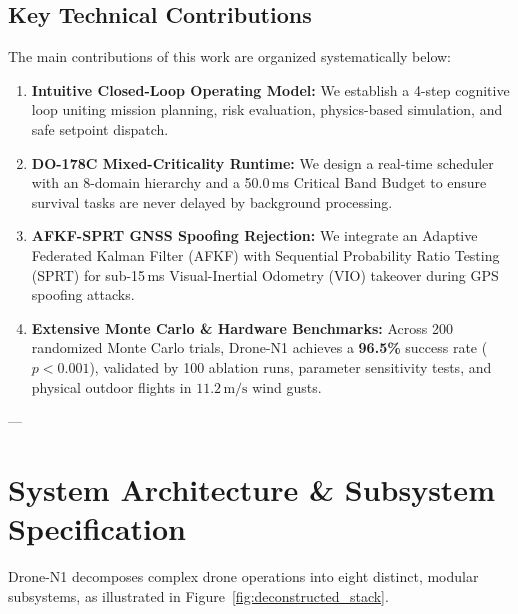 \documentclass[pdflatex,sn-mathphys-num]{sn-jnl}%
\theoremstyle{thmstyleone}%
\theoremstyle{thmstyletwo}%
\theoremstyle{thmstylethree}%
\begin{document}
\subsection{Key Technical Contributions}
The main contributions of this work are organized systematically below:
\begin{enumerate}
    \item \textbf{Intuitive Closed-Loop Operating Model:} We establish a 4-step cognitive loop uniting mission planning, risk evaluation, physics-based simulation, and safe setpoint dispatch.
    \item \textbf{DO-178C Mixed-Criticality Runtime:} We design a real-time scheduler with an 8-domain hierarchy and a 50.0\,ms Critical Band Budget to ensure survival tasks are never delayed by background processing.
    \item \textbf{AFKF-SPRT GNSS Spoofing Rejection:} We integrate an Adaptive Federated Kalman Filter (AFKF) with Sequential Probability Ratio Testing (SPRT) for sub-15\,ms Visual-Inertial Odometry (VIO) takeover during GPS spoofing attacks.
    \item \textbf{Extensive Monte Carlo \& Hardware Benchmarks:} Across 200 randomized Monte Carlo trials, Drone-N1 achieves a \textbf{96.5\%} success rate ($p < 0.001$), validated by 100 ablation runs, parameter sensitivity tests, and physical outdoor flights in $11.2\,\text{m/s}$ wind gusts.
\end{enumerate}

---

\section{System Architecture \& Subsystem Specification}\label{sec:architecture}

Drone-N1 decomposes complex drone operations into eight distinct, modular subsystems, as illustrated in Figure~\ref{fig:deconstructed_stack}.
\end{document}
